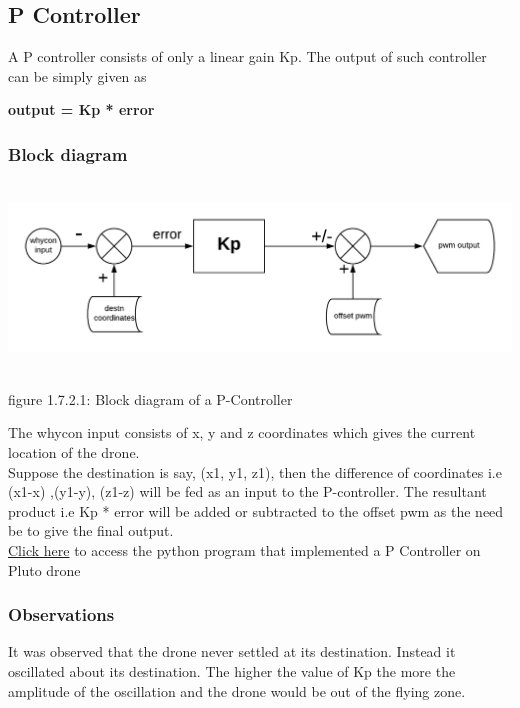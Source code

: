 \documentclass[a4paper,12pt,oneside]{book}
\begin{document}
\subsection{P Controller}
A P controller consists of only a linear gain Kp. The output of such controller can be simply given as 
\begin{center}
\textbf{output  = Kp * error}
\end{center}   
 
\subsubsection{\textbf{Block diagram}}
\includegraphics[width = 15cm , height= 5cm]{P.png}
\begin{center}
    figure 1.7.2.1: Block diagram of a P-Controller
\end{center}

The whycon input consists of x, y and z coordinates which gives the current location of the drone.\\
Suppose the destination is say, (x1, y1, z1), then the difference of coordinates i.e (x1-x) ,(y1-y), (z1-z) will be fed as an input to the P-controller.
The resultant product i.e Kp * error will be added or subtracted to the offset pwm as the need be to give the final output.\\


\href{https://github.com/eYSIP-2018/Autotuning-of-Controller-For-Drone/blob/karthik/P-controller.py}{Click here} to access the python program that implemented a P Controller on Pluto drone\\

\subsubsection{\textbf{Observations}}
It was observed that the drone never settled at its destination. Instead it oscillated about its destination.
The higher the value of Kp the more the amplitude of the oscillation and the drone would be out of the flying zone.\\
\end{document}
